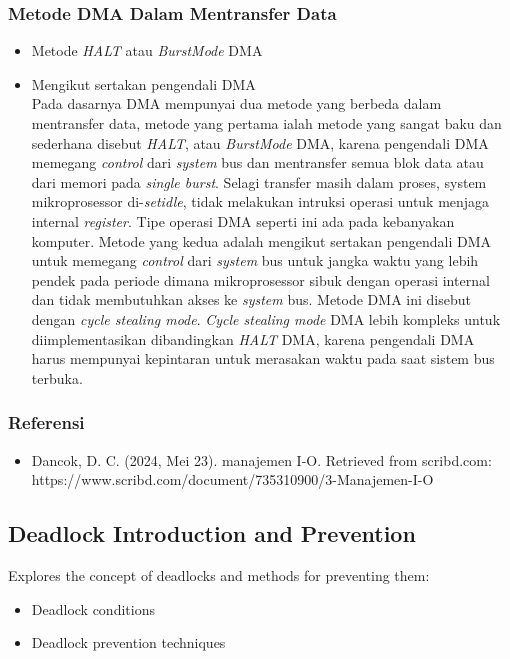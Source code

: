 \documentclass[12pt]{article}
\begin{document}
\subsubsection{Metode DMA Dalam Mentransfer Data}
\begin{itemize}
    \item Metode \textit{HALT} atau \textit{BurstMode} DMA
    \item Mengikut sertakan pengendali DMA \\
    Pada dasarnya DMA mempunyai dua metode yang berbeda dalam mentransfer data, metode yang pertama ialah metode yang sangat baku dan sederhana disebut\textit{ HALT}, atau \textit{BurstMode} DMA, karena pengendali DMA memegang \textit{control} dari \textit{system} bus dan mentransfer semua blok data atau dari memori pada \textit{single burst}. Selagi transfer masih dalam proses, system mikroprosessor di-\textit{setidle}, tidak melakukan intruksi operasi untuk menjaga internal \textit{register}. Tipe operasi DMA seperti ini ada pada kebanyakan komputer. Metode yang kedua adalah mengikut sertakan pengendali DMA untuk memegang \textit{control} dari \textit{system }bus untuk jangka waktu yang lebih pendek pada periode dimana mikroprosessor sibuk dengan operasi internal dan tidak membutuhkan akses ke\textit{ system }bus. Metode DMA ini disebut dengan \textit{cycle stealing mode}.\textit{ Cycle stealing mode} DMA lebih kompleks untuk diimplementasikan dibandingkan \textit{HALT} DMA, karena pengendali DMA harus mempunyai kepintaran untuk merasakan waktu pada saat sistem bus terbuka.
\end{itemize}

\subsubsection{Referensi}
\begin{itemize}
    \item Dancok, D. C. (2024, Mei 23). manajemen I-O. Retrieved from scribd.com: https://www.scribd.com/document/735310900/3-Manajemen-I-O 
\end{itemize}

\subsection{Deadlock Introduction and Prevention}
Explores the concept of deadlocks and methods for preventing them:
\begin{itemize}
    \item Deadlock conditions
    \item Deadlock prevention techniques
\end{itemize}
\end{document}
